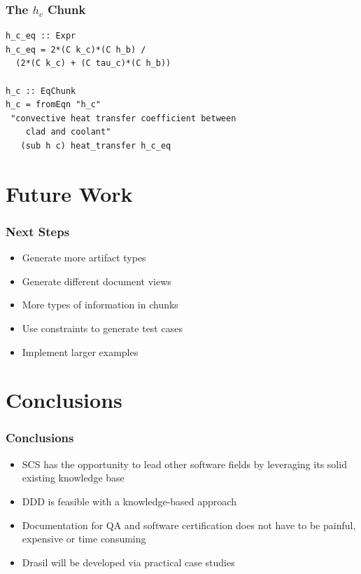 \documentclass{beamer}
\begin{document}

\begin{frame}[fragile]

\frametitle{The $h_c$ Chunk}

\begin{lstlisting}[frame=none, showstringspaces=false, basicstyle=\small]
h_c_eq :: Expr
h_c_eq = 2*(C k_c)*(C h_b) /
  (2*(C k_c) + (C tau_c)*(C h_b))

h_c :: EqChunk
h_c = fromEqn "h_c" 
 "convective heat transfer coefficient between 
    clad and coolant"
   (sub h c) heat_transfer h_c_eq

\end{lstlisting}

\end{frame}


\section[Future Work]{Future Work}


\begin{frame}

\frametitle{Next Steps}

\begin{itemize}
\item Generate more artifact types
\item Generate different document views
\item More types of information in chunks
\item Use constraints to generate test cases
\item Implement larger examples
\end{itemize}

\end{frame}


\section[Conclusions]{Conclusions}


\begin{frame}

\frametitle{Conclusions}

\begin{itemize}
\item SCS has the opportunity to lead other software fields by leveraging its
  solid existing knowledge base
\item DDD is feasible with a knowledge-based approach
\item Documentation for QA and software certification does not have to be
  painful, expensive or time consuming
\item Drasil will be developed via practical case studies
\end{itemize}
\end{frame}

\end{document}
